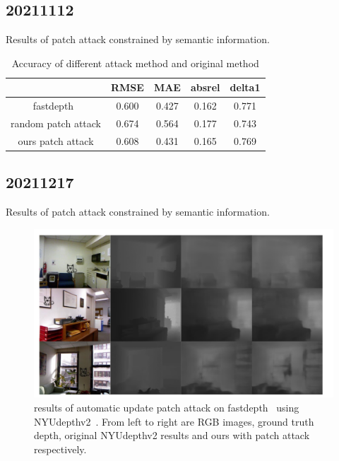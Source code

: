 \documentclass[10pt]{beamer}
\begin{document}
\subsection{20211112}
\begin{frame}
  Results of patch attack constrained by semantic information.
  \begin{table}
    \centering  %
    \caption{Accuracy of different attack method and original method}  %
    \label{table1}  %
    \begin{tabular}{c|c|c|c|c}  
      \hline  %
      &RMSE&MAE&absrel&delta1 \\  %
      \hline
      fastdepth~\cite{fastdepth}&0.600&0.427&0.162&0.771 \\
      random patch attack&0.674&0.564&0.177&0.743 \\
      ours patch attack&0.608&0.431&0.165&0.769 \\
      \hline
    \end{tabular}
  \end{table}
\end{frame}

\subsection{20211217}
\begin{frame}
  Results of patch attack constrained by semantic information.
  \begin{figure}
    \includegraphics[width=1\linewidth]{figure/20211217/automatic_update_patch_result.pdf}
    \caption{results of automatic update patch attack on fastdepth~\cite{fastdepth}
    using NYUdepthv2~\cite{nyudepthv2}. From left to right are RGB images, ground truth depth,
    original NYUdepthv2 results and ours with patch attack respectively.}
  \end{figure}

\end{frame}
\end{document}

